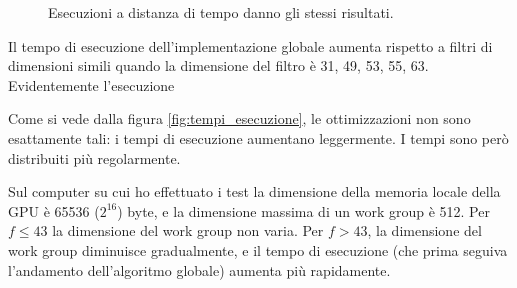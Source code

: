 \documentclass[10pt]{myarticle}
\begin{document}
\begin{figure}[tbh]
\centering
{}
	\caption{Esecuzioni a distanza di tempo danno gli stessi risultati.}
	\label{fig:tempi_costanti}
\end{figure}

Il tempo di esecuzione dell'implementazione globale aumenta rispetto a filtri di dimensioni simili quando la dimensione del filtro \`e 31, 49, 53, 55, 63.
Evidentemente l'esecuzione 

Come si vede dalla figura \ref{fig:tempi_esecuzione}, le ottimizzazioni non sono esattamente tali: i tempi di esecuzione aumentano leggermente.
I tempi sono per\`o distribuiti pi\`u regolarmente.

Sul computer su cui ho effettuato i test la dimensione della memoria locale della GPU \`e 65536 ($2^{16}$) byte, e la dimensione massima di un work group \`e 512.
Per $f \le 43$ la dimensione del work group non varia.
Per $f > 43$, la dimensione del work group diminuisce gradualmente, e il tempo di esecuzione (che prima seguiva l'andamento dell'algoritmo globale) aumenta pi\`u rapidamente.
\end{document}
